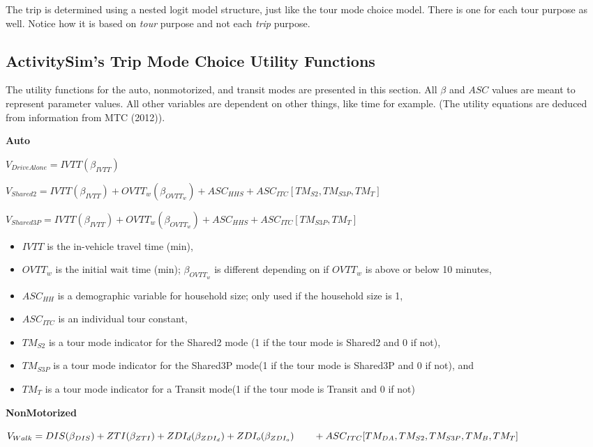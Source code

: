 \documentclass[12pt, oneside, openright]{byuthesis}
\providecommand{\tightlist}{%
  \setlength{\itemsep}{0pt}\setlength{\parskip}{0pt}}
\begin{document}
The trip is determined using a nested logit model structure, just like the tour mode choice model. There is one for each tour purpose as well. Notice how it is based on \emph{tour} purpose and not each \emph{trip} purpose.

\hypertarget{lit421}{%
\subsection{ActivitySim's Trip Mode Choice Utility Functions}\label{lit421}}

The utility functions for the auto, nonmotorized, and transit modes are presented in this section. All \(\beta\) and \(ASC\) values are meant to represent parameter values. All other variables are dependent on other things, like time for example. (The utility equations are deduced from information from MTC (2012)).

\textbf{Auto}

\(V_{DriveAlone} = IVTT(\beta_{IVTT})\)

\(V_{Shared2} = IVTT(\beta_{IVTT}) + OVTT_w(\beta_{OVTT_w}) + ASC_{HHS} + ASC_{ITC}[TM_{S2}, TM_{S3P}, TM_T]\)

\(V_{Shared3P} = IVTT(\beta_{IVTT}) + OVTT_w(\beta_{OVTT_w}) + ASC_{HHS} + ASC_{ITC}[TM_{S3P}, TM_T]\)

\begin{itemize}
\tightlist
\item
  \(IVTT\) is the in-vehicle travel time (min),
\item
  \(OVTT_w\) is the initial wait time (min); \(\beta_{OVTT_w}\) is different depending on if \(OVTT_w\) is above or below 10 minutes,
\item
  \(ASC_{HH}\) is a demographic variable for household size; only used if the household size is 1,
\item
  \(ASC_{ITC}\) is an individual tour constant,
\item
  \(TM_{S2}\) is a tour mode indicator for the Shared2 mode (1 if the tour mode is Shared2 and 0 if not),
\item
  \(TM_{S3P}\) is a tour mode indicator for the Shared3P mode(1 if the tour mode is Shared3P and 0 if not), and
\item
  \(TM_{T}\) is a tour mode indicator for a Transit mode(1 if the tour mode is Transit and 0 if not)
\end{itemize}

\textbf{NonMotorized}

\(V_{Walk} = DIS(\beta_{DIS}) + ZTI(\beta_{ZTI}) + ZDI_d(\beta_{ZDI_d}) + ZDI_o(\beta_{ZDI_o}) \\ \qquad+ ASC_{ITC}[TM_{DA}, TM_{S2}, TM_{S3P}, TM_{B}, TM_{T}]\)
\end{document}
